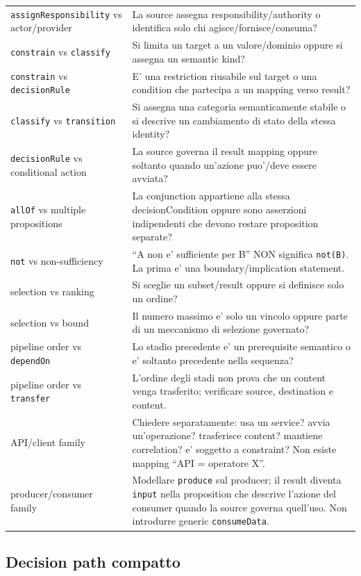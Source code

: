 \documentclass[11pt,a4paper]{article}
\begin{document}
\begin{longtable}{L{44mm}L{95mm}}
\texttt{assignResponsibility} vs actor/provider & La source assegna responsibility/authority o identifica solo chi agisce/fornisce/consuma? \\
\texttt{constrain} vs \texttt{classify} & Si limita un target a un valore/dominio oppure si assegna un semantic kind? \\
\texttt{constrain} vs \texttt{decisionRule} & E' una restriction riusabile sul target o una condition che partecipa a un mapping verso result? \\
\texttt{classify} vs \texttt{transition} & Si assegna una categoria semanticamente stabile o si descrive un cambiamento di stato della stessa identity? \\
\texttt{decisionRule} vs conditional action & La source governa il result mapping oppure soltanto quando un'azione puo'/deve essere avviata? \\
\texttt{allOf} vs multiple propositions & La conjunction appartiene alla stessa decisionCondition oppure sono asserzioni indipendenti che devono restare proposition separate? \\
\texttt{not} vs non-sufficiency & ``A non e' sufficiente per B'' NON significa \texttt{not(B)}. La prima e' una boundary/implication statement. \\
selection vs ranking & Si sceglie un subset/result oppure si definisce solo un ordine? \\
selection vs bound & Il numero massimo e' solo un vincolo oppure parte di un meccanismo di selezione governato? \\
pipeline order vs \texttt{dependOn} & Lo stadio precedente e' un prerequisite semantico o e' soltanto precedente nella sequenza? \\
pipeline order vs \texttt{transfer} & L'ordine degli stadi non prova che un content venga trasferito; verificare source, destination e content. \\
API/client family & Chiedere separatamente: usa un service? avvia un'operazione? trasferisce content? mantiene correlation? e' soggetto a constraint? Non esiste mapping ``API = operatore X''. \\
producer/consumer family & Modellare \texttt{produce} sul producer; il result diventa \texttt{input} nella proposition che descrive l'azione del consumer quando la source governa quell'uso. Non introdurre generic \texttt{consumeData}. \\
\bottomrule
\end{longtable}

\subsection{Decision path compatto}
\end{document}
